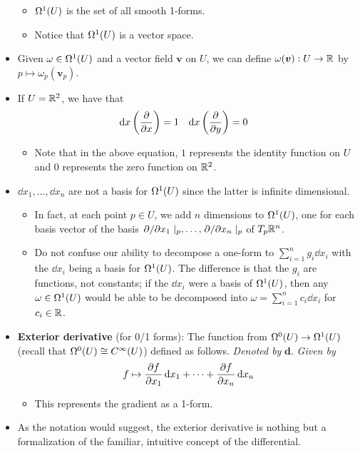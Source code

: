 \documentclass[../notes.tex]{subfiles}
\begin{document}
\begin{itemize}
\begin{itemize}
        \item $\ome[1]{U}$ is the set of all smooth 1-forms.
        \item Notice that $\ome[1]{U}$ is a vector space.
    \end{itemize}
    \item Given $\omega\in\ome[1]{U}$ and a vector field $\bm{v}$ on $U$, we can define $\omega(\bm{v}):U\to\R$ by $p\mapsto\omega_p(\bm{v}_p)$.
    \item If $U=\R^2$, we have that
    \begin{align*}
        \dd{x}\left( \pdv{x} \right) &= 1&
        \dd{x}\left( \pdv{y} \right) &= 0
    \end{align*}
    \begin{itemize}
        \item Note that in the above equation, $1$ represents the identity function on $U$ and $0$ represents the zero function on $\R^2$.
    \end{itemize}
    \item $\dd{x_1},\dots,\dd{x_n}$ are not a basis for $\ome[1]{U}$ since the latter is infinite dimensional.
    \begin{itemize}
        \item In fact, at each point $p\in U$, we add $n$ dimensions to $\ome[1]{U}$, one for each basis vector of the basis $\pdv*{x_1}|_p,\dots,\pdv*{x_n}|_p$ of $T_p\R^n$.
        \item Do not confuse our ability to decompose a one-form to $\sum_{i=1}^ng_i\dd{x_i}$ with the $\dd{x_i}$ being a basis for $\ome[1]{U}$. The difference is that the $g_i$ are functions, not constants; if the $\dd{x_i}$ were a basis of $\ome[1]{U}$, then any $\omega\in\ome[1]{U}$ would be able to be decomposed into $\omega=\sum_{i=1}^nc_i\dd{x_i}$ for $c_i\in\R$.
    \end{itemize}
    \item \textbf{Exterior derivative} (for 0/1 forms): The function from $\ome[0]{U}\to\ome[1]{U}$ (recall that $\ome[0]{U}\cong C^\infty(U)$) defined as follows. \emph{Denoted by} $\mathbf{d}$. \emph{Given by}
    \begin{equation*}
        f \mapsto \pdv{f}{x_1}\dd{x_1}+\cdots+\pdv{f}{x_n}\dd{x_n}
    \end{equation*}
    \begin{itemize}
        \item This represents the gradient as a 1-form.
    \end{itemize}
    \item As the notation would suggest, the exterior derivative is nothing but a formalization of the familiar, intuitive concept of the differential.

\end{itemize}
\end{document}
